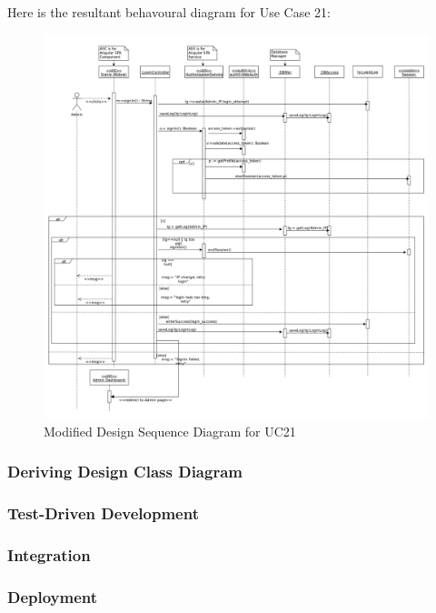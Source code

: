 \documentclass[11pt]{article}
\begin{document}
Here is the resultant behavoural diagram for Use Case 21:

\begin{figure}[H]
		\centering
		\hspace*{-1.7cm}\includegraphics[width=1.2\textwidth]{../../images/Patternted_Design_Sequence_Diagram_UC21.png}
		\caption{Modified Design Sequence Diagram for UC21}
\end{figure}
\subsubsection{Deriving Design Class Diagram}
 
\subsubsection{Test-Driven Development}
 
\subsubsection{Integration}
 
\subsubsection{Deployment}
\end{document}
